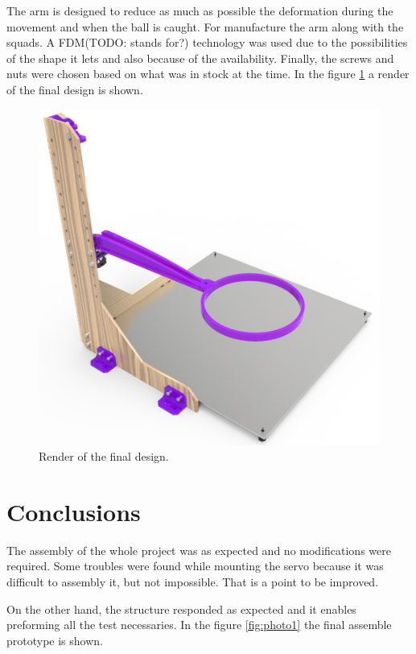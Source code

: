 		The arm is designed to reduce as much as possible the deformation during the movement and when the ball is caught. For manufacture the arm along with the squads. A FDM(TODO: stands for?) technology was used due to the possibilities of the shape it lets and also because of the availability. Finally, the screws and nuts were chosen based on what was in stock at the time. In the figure \ref{fig:render2} a render of the final design is shown.

		\begin{figure}[!hb]
			\begin{center}
				\includegraphics[width=.8\textwidth]{figures/render2}
			\end{center}
			\caption{Render of the final design.}
			\label{fig:render2}
		\end{figure}

	\section{Conclusions} %
	\label{sec:mechanics_conclusions}
		The assembly of the whole project was as expected and no modifications were required. Some troubles were found while mounting the servo because it was difficult to assembly it, but not impossible. That is a point to be improved.

		On the other hand, the structure responded as expected and it enables preforming all the test necessaries. In the figure \ref{fig:photo1} the final assemble prototype is shown.

